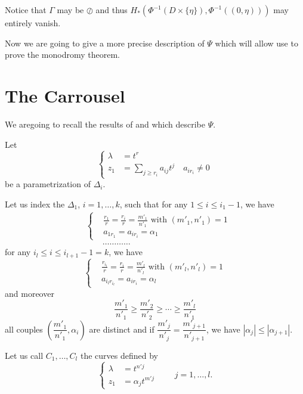 Notice that $\Gamma$ may be $\oslash$ and thus $H_* (\Phi^{-1} (D \times \{\eta\}), \Phi^{-1} ((0,\eta)))$ may entirely vanish. 

Now we are going to give a more precise description of $\Psi$ which will allow use to prove the monodromy theorem.

\section{The Carrousel}\label{art15-sec2}
We are\pageoriginale going to recall the results of \cite{art15-key6} and \cite{art15-key7} which describe $\Psi$.

Let 
\begin{equation*}
\left\{
\begin{aligned}
\lambda  & = t^r \\
z_1 & = \sum\limits_{j \geqslant r_i} a_{ij} t^j \quad a_{ir_i} \neq 0 
\end{aligned}
\right.
\tag{2.1}\label{art15-eq2.1}
\end{equation*}
be a parametrization of $\Delta_i$.

Let us index the $\Delta_1$, $i=1, \ldots, k$, such that  for any $1 \leqslant i \leqslant i_1 - 1$, we have
\begin{align*}
& \left\{
\begin{aligned}
& \frac{r_1}{r} = \frac{r_i}{r} = \frac{m'_1}{n'_1} \text{ with } (m'_1, n'_1) =1 \\
& a_{1r_1} = a_{ir_i} = \alpha_1
\end{aligned}
\right. \tag{2.2}\label{art15-eq2.2}\\
& \qquad \ldots \ldots \ldots \ldots 
\end{align*}
for any $i_l \leqslant i \leqslant i_{l+1} - 1 =k$, we have 
\begin{equation*}
\left\{
\begin{aligned}
& \frac{r_{i_l}}{r} = \frac{r_i}{r} = \frac{m'_l}{n'_l} \text{ with } (m'_l, n'_l) = 1\\
& a_{i_l r_{i_l}} = a_{ir_i} =\alpha_l
\end{aligned}
\right.
\end{equation*}
and moreover
$$
\frac{m'_1}{n'_1} \geqslant \frac{m'_2}{n'_2} \geqslant \cdots \geqslant \frac{m'_l}{n'_1}
$$
all couples $\left(\dfrac{m'_1}{n'_1}, \alpha_i \right)$ are distinct and if $\dfrac{m'_j}{n'_j} = \dfrac{m'_{j+1}}{n'_{j+1}}$, we have $|\alpha_{j}|\leqslant |\alpha_{j+1}|$. 

Let us call $C_1, \ldots, C_l$ the curves defined by 
\begin{equation*}
\left\{
\begin{aligned}
\lambda & = t^{n'j} \\
z_1 & = \alpha_j t^{m'j}
\end{aligned}
\right.
\qquad j = 1, \ldots, l. \tag{2.3}\label{art15-eq2.3}
\end{equation*}

